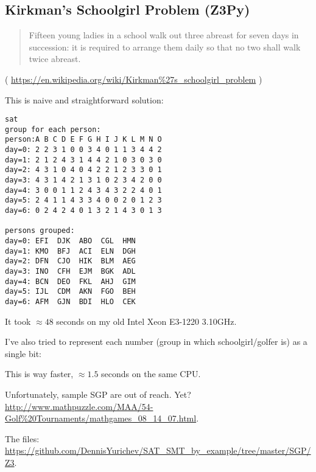 \subsection{Kirkman's Schoolgirl Problem (Z3Py)}

\begin{framed}
\begin{quotation}

Fifteen young ladies in a school walk out three abreast for seven days in succession: it is required to arrange them daily so that no two shall walk twice abreast.

\end{quotation}
\end{framed}

( \url{https://en.wikipedia.org/wiki/Kirkman%27s_schoolgirl_problem} )

This is naive and straightforward solution:



\begin{lstlisting}
sat
group for each person:
person:A B C D E F G H I J K L M N O
day=0: 2 2 3 1 0 0 3 4 0 1 1 3 4 4 2
day=1: 2 1 2 4 3 1 4 4 2 1 0 3 0 3 0
day=2: 4 3 1 0 4 0 4 2 2 1 2 3 3 0 1
day=3: 4 3 1 4 2 1 3 1 0 2 3 4 2 0 0
day=4: 3 0 0 1 1 2 4 3 4 3 2 2 4 0 1
day=5: 2 4 1 1 4 3 3 4 0 0 2 0 1 2 3
day=6: 0 2 4 2 4 0 1 3 2 1 4 3 0 1 3

persons grouped:
day=0: EFI  DJK  ABO  CGL  HMN
day=1: KMO  BFJ  ACI  ELN  DGH
day=2: DFN  CJO  HIK  BLM  AEG
day=3: INO  CFH  EJM  BGK  ADL
day=4: BCN  DEO  FKL  AHJ  GIM
day=5: IJL  CDM  AKN  FGO  BEH
day=6: AFM  GJN  BDI  HLO  CEK
\end{lstlisting}

It took $\approx 48$ seconds on my old Intel Xeon E3-1220 3.10GHz.

I've also tried to represent each number (group in which schoolgirl/golfer is) as a single bit:



This is way faster, $\approx 1.5$ seconds on the same CPU.

Unfortunately, sample \ac{SGP} are out of reach. Yet?
\url{http://www.mathpuzzle.com/MAA/54-Golf%20Tournaments/mathgames_08_14_07.html}.

The files: \url{https://github.com/DennisYurichev/SAT_SMT_by_example/tree/master/SGP/Z3}.

